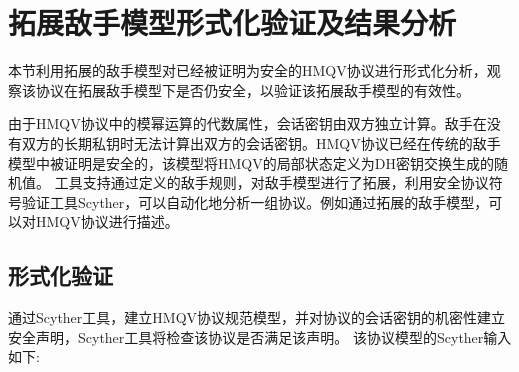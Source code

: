


\section{拓展敌手模型形式化验证及结果分析}

本节利用拓展的敌手模型对已经被证明为安全的HMQV协议进行形式化分析，观察该协议在拓展敌手模型下是否仍安全，以验证该拓展敌手模型的有效性。

	由于HMQV协议中的模幂运算的代数属性，会话密钥由双方独立计算。敌手在没有双方的长期私钥时无法计算出双方的会话密钥。HMQV协议已经在传统的敌手模型中被证明是安全的，该模型将HMQV的局部状态定义为DH密钥交换生成的随机值。
工具支持通过定义的敌手规则，对敌手模型进行了拓展，利用安全协议符号验证工具Scyther，可以自动化地分析一组协议。例如通过拓展的敌手模型，可以对HMQV协议进行描述。
\subsection{形式化验证}

通过Scyther工具，建立HMQV协议规范模型，并对协议的会话密钥的机密性建立安全声明，Scyther工具将检查该协议是否满足该声明。
该协议模型的Scyther输入如下:


